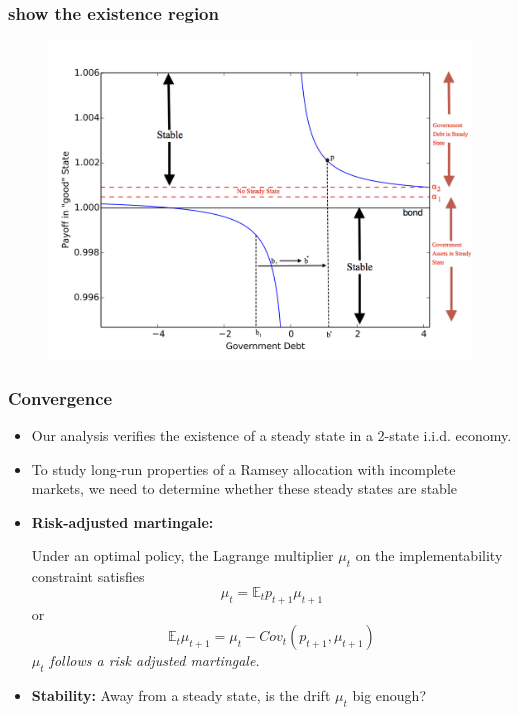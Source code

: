 \documentclass{beamer}
\newcommand{\EE}{\mathbb E}
\begin{document}
\begin{frame}
   \frametitle{show the existence region}
	\begin{figure}
		\begin{center}
		\includegraphics[scale=.5]{Images/graph.png}
	\end{center}	
	\end{figure}

  \end{frame}

  
 \begin{frame}
  \frametitle{Convergence}
  \begin{itemize}
		\item Our analysis verifies the existence of a steady state in a 2-state i.i.d. economy.
		\item To study long-run properties of a Ramsey allocation with incomplete markets, we need to determine whether these steady states are stable
		\item \textbf{Risk-adjusted martingale:}
		
		Under an optimal policy, the Lagrange multiplier $\mu_t$ on the implementability  constraint   satisfies
		\[
			\mu_t = \EE_t p_{t+1} \mu_{t+1}
		\] or
		\[
		\EE_t  \mu_{t+1}	= \mu_t -Cov_t (p_{t+1}, \mu_{t+1})
		\]
			\emph{$\mu_t$ follows a risk adjusted martingale.}
	
		\item \textbf{Stability: }   Away from a steady state, is the drift  $\mu_t$ big enough?
		\end{itemize}
	
 \end{frame}
\end{document}
